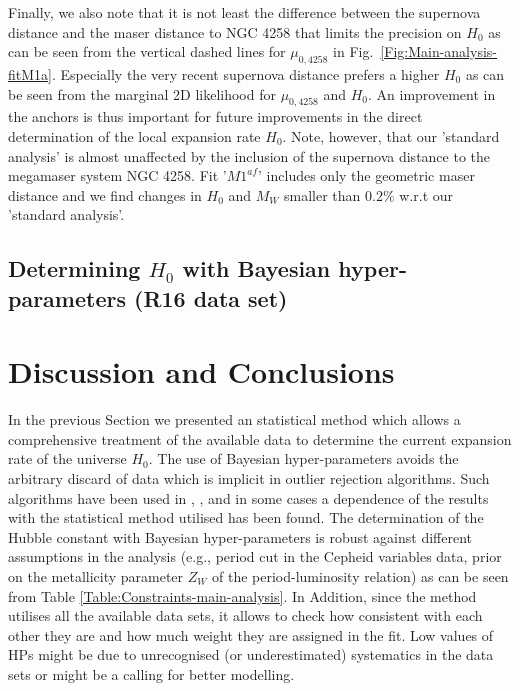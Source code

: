 Finally, we also note that it is not least the difference between the supernova distance \cite{Polshaw:2015ika} and
the maser distance \cite{Humphreys:2013eja} to NGC 4258 that limits the precision on $H_0$ as can be seen from the vertical dashed lines
for $\mu_{0,4258}$ in Fig.\ \ref{Fig:Main-analysis-fitM1a}. Especially the very recent supernova distance prefers a higher $H_0$ as can be seen
from the marginal 2D likelihood for $\mu_{0,4258}$ and $H_0$. An improvement in the anchors is thus important for future improvements in the
direct determination of the local expansion rate $H_0$. Note, however, that our 'standard analysis' is almost unaffected by the inclusion of the supernova distance \cite{Polshaw:2015ika} to the megamaser system NGC 4258. Fit '$M1^{af}$' includes only the geometric maser distance \cite{Humphreys:2013eja} and we find changes in $H_0$ and $M_W$ smaller than $0.2\%$ w.r.t our 'standard analysis'.

\subsection{Determining $H_0$ with Bayesian hyper-parameters (R16 data set)}
\label{Subsection:combining-anchors-R16}

\section{Discussion and Conclusions}
\label{chapter-h0:Summary}


In the previous Section we presented an statistical method which allows a comprehensive treatment of the available data to determine the current expansion rate of the universe $H_0$. The use of Bayesian hyper-parameters avoids the arbitrary discard of data which is implicit in outlier rejection algorithms. Such algorithms have been used in  \cite{Riess:2009pu}, \cite{Riess:2011yx}, \cite{Efstathiou:2013via} and in some cases a dependence of the results with the statistical method utilised has been found. The determination of the Hubble constant with Bayesian hyper-parameters is robust against different assumptions in the analysis (e.g., period cut in the Cepheid variables data, prior on the metallicity parameter $Z_W$ of the period-luminosity relation) as can be seen from Table \ref{Table:Constraints-main-analysis}. In Addition, since the method utilises all the available data sets, it allows to check how consistent with each other they are and how much weight they are assigned in the fit. Low values of HPs might be due to unrecognised (or underestimated) systematics in the data sets or might be a calling for better modelling.

